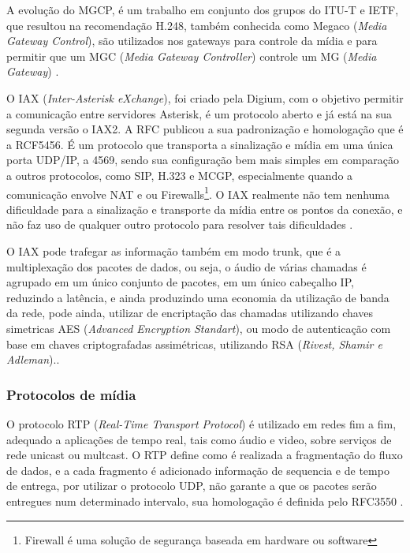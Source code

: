A evolução do MGCP, é um trabalho em conjunto dos grupos do ITU-T e IETF, que resultou na recomendação H.248, também conhecida como Megaco (\textit{Media Gateway Control}), são utilizados nos gateways para controle da mídia e para permitir que um MGC (\textit{Media Gateway Controller}) controle um MG (\textit{Media Gateway}) \cite{theodorewallingford2005}.

O IAX (\textit{Inter-Asterisk eXchange}), foi criado pela Digium, com o objetivo permitir a comunicação entre servidores Asterisk, é um protocolo aberto e já está na sua segunda versão o IAX2. A RFC publicou a sua padronização e homologação que é a RCF5456. É um protocolo que transporta a sinalização e mídia em uma única porta UDP/IP, a 4569, sendo sua configuração bem mais simples em comparação a outros protocolos, como SIP, H.323 e MCGP, especialmente quando a comunicação envolve NAT e ou Firewalls\footnote{Firewall é uma solução de segurança baseada em hardware ou software}. O IAX realmente não tem nenhuma dificuldade para a sinalização e transporte da mídia entre os pontos da conexão, e não faz uso de qualquer outro protocolo para resolver tais dificuldades \cite{alexandrekeller2014}.

O IAX pode trafegar as informação também em modo trunk, que é a multiplexação dos pacotes de dados, ou seja, o áudio de várias chamadas é agrupado em um único conjunto de pacotes, em um único cabeçalho IP, reduzindo a latência, e ainda produzindo uma economia da utilização de banda da rede, pode ainda, utilizar de encriptação das chamadas utilizando chaves simetricas AES (\textit{Advanced Encryption Standart}), ou modo de autenticação com base em chaves criptografadas assimétricas, utilizando RSA (\textit{Rivest, Shamir e Adleman}).\cite{alexandrekeller2014}.

\subsubsection{Protocolos de mídia}

O protocolo RTP (\textit{Real-Time Transport Protocol}) é utilizado em redes fim a fim, adequado a  aplicações de tempo real, tais como áudio e video, sobre serviços de rede unicast ou multcast. O RTP define como é realizada a fragmentação do fluxo de dados, e a cada fragmento é adicionado informação de sequencia e de tempo de entrega, por utilizar o protocolo UDP, não garante a que os pacotes serão entregues num determinado intervalo, sua homologação é definida pelo RFC3550 \cite{henningcasnervan1996}.

